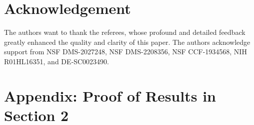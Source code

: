 \documentclass[twoside,11pt]{article}
\begin{document}



\section*{Acknowledgement}

The authors want to thank the referees, whose profound and detailed feedback greatly enhanced the quality and clarity of this paper.
The authors acknowledge support from NSF DMS-2027248, NSF DMS-2208356, NSF CCF-1934568, NIH R01HL16351, and DE‐SC0023490.


\appendix
\section{Appendix: Proof of Results in Section 2} \label{A:Section 2 Appendix}
\end{document}
